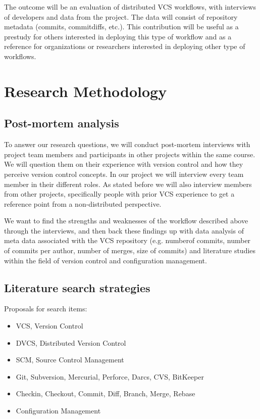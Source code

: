 \documentclass{article}
\begin{document}
The outcome will be an evaluation of distributed VCS workflows, with
interviews of developers and data from the project. The data will
consist of repository metadata (commits, commitdiffs, etc.). This
contribution will be useful as a prestudy for others interested in
deploying this type of workflow and as a reference for organizations or
researchers interested in deploying other type of workflows.

\section{Research Methodology}

\subsection{Post-mortem analysis}
To answer our research questions, we will conduct post-mortem
interviews with project team members and participants in other
projects within the same course. We will question them on their
experience with version control and how they perceive version control
concepts. In our project we will interview every team member in their
different roles. As stated before we will also interview members from
other projects, specifically people with prior VCS experience to get a
reference point from a non-distributed perspective.

We want to find the strengths and weaknesses of the workflow described
above through the interviews, and then back these findings up with
data analysis of meta data associated with the VCS repository
(e.g. numberof commits, number of commits per author, number of
merges, size of commits) and literature studies within the field of
version control and configuration management.

\subsection{Literature search strategies}

Proposals for search items:
\begin{itemize}
  \item VCS, Version Control
  \item DVCS, Distributed Version Control
  \item SCM, Source Control Management
  \item Git, Subversion, Mercurial, Perforce, Darcs, CVS, BitKeeper
  \item Checkin, Checkout, Commit, Diff, Branch, Merge, Rebase
  \item Configuration Management
\end{itemize}
\end{document}
